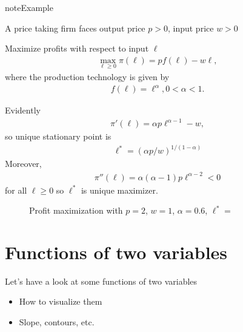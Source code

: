 \documentclass[letterpaper,10pt,english]{jupyterBook}
\begin{document}
\begin{sphinxadmonition}{note}{Example}

\sphinxAtStartPar
A price taking firm faces output price \(p > 0\), input price \(w >0\)

\sphinxAtStartPar
Maximize profits with respect to input \(\ell\)
\begin{equation*}
\begin{split}
\max_{\ell \ge 0} \pi(\ell) = p f(\ell) - w \ell,
\end{split}
\end{equation*}
\sphinxAtStartPar
where the production technology is given by
\begin{equation*}
\begin{split}
f(\ell) = \ell^{\alpha}, 0 < \alpha < 1.
\end{split}
\end{equation*}\end{sphinxadmonition}

\sphinxAtStartPar
Evidently
\begin{equation*}
\begin{split}
\pi'(\ell) = \alpha p \ell^{\alpha - 1} - w,
\end{split}
\end{equation*}
\sphinxAtStartPar
so unique stationary point is
\begin{equation*}
\begin{split}
\ell^* = (\alpha p/w)^{1/(1 - \alpha)}
\end{split}
\end{equation*}
\sphinxAtStartPar
Moreover,
\begin{equation*}
\begin{split}
\pi''(\ell) = \alpha (\alpha - 1) p \ell^{\alpha - 2} < 0
\end{split}
\end{equation*}
\sphinxAtStartPar
for all \(\ell \ge 0\) so \(\ell^*\) is unique maximizer.

\begin{figure}[htbp]
\centering
\capstart

\noindent{}
\caption{Profit maximization with \(p=2\), \(w=1\), \(\alpha=0.6\), \(\ell^*=\)}\label{\detokenize{02.optimization_intro:id5}}\end{figure}


\section{Functions of two variables}
\label{\detokenize{02.optimization_intro:functions-of-two-variables}}
\sphinxAtStartPar
Let’s have a look at some functions of two variables
\begin{itemize}
\item {} 
\sphinxAtStartPar
How to visualize them

\item {} 
\sphinxAtStartPar
Slope, contours, etc.

\end{itemize}
\end{document}
